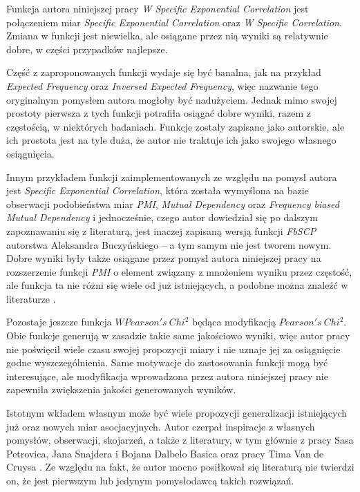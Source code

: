 \documentclass[11pt,a4paper]{llncs}
\begin{document}
\par
Funkcja autora niniejszej pracy \emph{W Specific Exponential Correlation} jest połączeniem miar \emph{Specific Exponential Correlation} oraz \emph{W Specific Correlation}.
Zmiana w funkcji jest niewielka, ale osiągane przez nią wyniki są relatywnie dobre, w części przypadków najlepsze.

\par
Część z zaproponowanych funkcji wydaje się być banalna, jak na przykład \emph{Expected Frequency} oraz \emph{Inversed Expected Frequency}, więc nazwanie tego oryginalnym pomysłem autora mogłoby być nadużyciem.
Jednak mimo swojej prostoty pierwsza z tych funkcji potrafiła osiągać dobre wyniki, razem z częstością, w niektórych badaniach.
Funkcje zostały zapisane jako autorskie, ale ich prostota jest na tyle duża, że autor nie traktuje ich jako swojego własnego osiągnięcia.

\par
Innym przykładem funkcji zaimplementowanych ze względu na pomysł autora jest \emph{Specific Exponential Correlation}, która została wymyślona na bazie obserwacji podobieństwa miar \emph{PMI}, \emph{Mutual Dependency} oraz \emph{Frequency biased Mutual Dependency} i jednocześnie, czego autor dowiedział się po dalszym zapoznawaniu się z literaturą, jest inaczej zapisaną wersją funkcji \emph{FbSCP} autorstwa Aleksandra Buczyńskiego \cite{buczynski} -- a tym samym nie jest tworem nowym. Dobre wyniki były także osiągane przez pomysł autora niniejszej pracy na rozszerzenie funkcji \emph{PMI} o element związany z mnożeniem wyniku przez częstość, ale funkcja ta nie różni się wiele od już istniejących, a podobne można znaleźć w literaturze \cite{wsec}.

\par
Pozostaje jeszcze funkcja $ W Pearson's \: Chi^{2} $ będąca modyfikacją $ Pearson's \: Chi^{2} $.
Obie funkcje generują w zasadzie takie same jakościowo wyniki, więc autor pracy nie poświęcił wiele czasu swojej propozycji miary i nie uznaje jej za osiągnięcie godne wyszczególnienia.
Same motywacje do zastosowania funkcji mogą być interesujące, ale modyfikacja wprowadzona przez autora niniejszej pracy nie zapewniła zwiększenia jakości generowanych wyników.

\par
Istotnym wkładem własnym może być wiele propozycji generalizacji istniejących już oraz nowych miar asocjacyjnych.
Autor czerpał inspiracje z własnych pomysłów, obserwacji, skojarzeń, a także z literatury, w tym głównie z pracy Sasa Petrovica, Jana Snajdera i Bojana Dalbelo Basica \cite{generalization_patterns} oraz pracy Tima Van de Cruysa \cite{mmi_w11}.
Ze względu na fakt, że autor mocno posiłkował się literaturą nie twierdzi on, że jest pierwszym lub jedynym pomysłodawcą takich rozwiązań.
\end{document}
